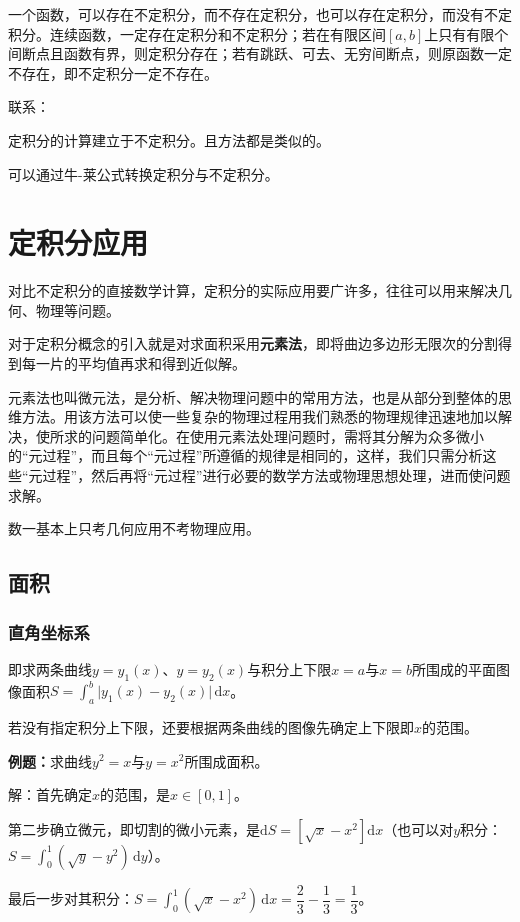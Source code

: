 \documentclass[UTF8, 12pt]{ctexart}
\begin{document}
一个函数，可以存在不定积分，而不存在定积分，也可以存在定积分，而没有不定积分。连续函数，一定存在定积分和不定积分；若在有限区间$[a,b]$上只有有限个间断点且函数有界，则定积分存在；若有跳跃、可去、无穷间断点，则原函数一定不存在，即不定积分一定不存在。

联系：

定积分的计算建立于不定积分。且方法都是类似的。

可以通过牛-莱公式转换定积分与不定积分。

\section{定积分应用}

对比不定积分的直接数学计算，定积分的实际应用要广许多，往往可以用来解决几何、物理等问题。

对于定积分概念的引入就是对求面积采用\textbf{元素法}，即将曲边多边形无限次的分割得到每一片的平均值再求和得到近似解。

元素法也叫微元法，是分析、解决物理问题中的常用方法，也是从部分到整体的思维方法。用该方法可以使一些复杂的物理过程用我们熟悉的物理规律迅速地加以解决，使所求的问题简单化。在使用元素法处理问题时，需将其分解为众多微小的“元过程”，而且每个“元过程”所遵循的规律是相同的，这样，我们只需分析这些“元过程”，然后再将“元过程”进行必要的数学方法或物理思想处理，进而使问题求解。

数一基本上只考几何应用不考物理应用。

\subsection{面积}

\subsubsection{直角坐标系}

即求两条曲线$y=y_1(x)$、$y=y_2(x)$与积分上下限$x=a$与$x=b$所围成的平面图像面积$S=\int_a^b\vert y_1(x)-y_2(x)\vert\,\textrm{d}x$。

若没有指定积分上下限，还要根据两条曲线的图像先确定上下限即$x$的范围。

\textbf{例题：}求曲线$y^2=x$与$y=x^2$所围成面积。

解：首先确定$x$的范围，是$x\in[0,1]$。

第二步确立微元，即切割的微小元素，是$\textrm{d}S=[\sqrt{x}-x^2]\textrm{d}x$（也可以对$y$积分：$S=\int_0^1(\sqrt{y}-y^2)\,\textrm{d}y$）。

最后一步对其积分：$S=\int_0^1(\sqrt{x}-x^2)\,\textrm{d}x=\dfrac{2}{3}-\dfrac{1}{3}=\dfrac{1}{3}$。
\end{document}
